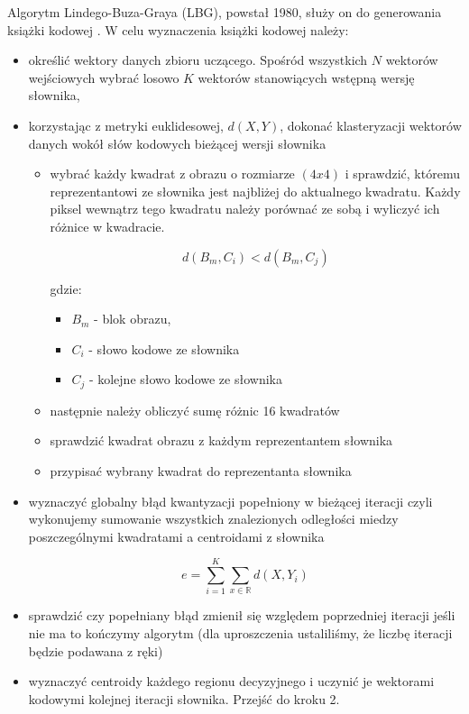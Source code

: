\documentclass{article}
\begin{document}
Algorytm Lindego-Buza-Graya (LBG), powstał 1980, służy on do generowania książki kodowej \cite{lbg1980}. W celu wyznaczenia książki kodowej należy:

\begin{itemize} 
  \item określić wektory danych zbioru uczącego. Spośród wszystkich $N$ wektorów wejściowych
        wybrać losowo $K$ wektorów stanowiących wstępną wersję słownika,
  \item korzystając z metryki euklidesowej, $d(X,Y)$, dokonać klasteryzacji wektorów danych wokół słów kodowych bieżącej wersji słownika
        \begin{itemize}
          \item wybrać każdy kwadrat z obrazu o rozmiarze $(4x4)$ i sprawdzić, któremu reprezentantowi ze słownika jest najbliżej do
                aktualnego kwadratu. Każdy piksel wewnątrz tego kwadratu należy porównać ze sobą i wyliczyć ich różnice w kwadracie.
                
                \begin{equation}
                  d(B_{m}, C_{i}) < d(B_{m}, C_{j})
                \end{equation}
                
                gdzie:
                \begin{itemize}[label=]
                  \item $B_{m}$ - blok obrazu,
                  \item $C_{i}$ - słowo kodowe ze słownika
                  \item $C_{j}$ - kolejne słowo kodowe ze słownika
                \end{itemize}
                
          \item następnie należy obliczyć sumę różnic 16 kwadratów
          \item sprawdzić kwadrat obrazu z każdym reprezentantem słownika
          \item przypisać wybrany kwadrat do reprezentanta słownika
        \end{itemize}
  \item wyznaczyć globalny błąd kwantyzacji popełniony w bieżącej iteracji czyli wykonujemy sumowanie wszystkich
        znalezionych odległości miedzy poszczególnymi kwadratami a centroidami z słownika
        
        \begin{equation}
          \label{eq:lbg_error}
          e = \sum_{i=1}^K \sum_{x\in\mathbb{R}} d(X, Y_{i}) 
        \end{equation}
        
  \item sprawdzić czy popełniany błąd zmienił się względem poprzedniej iteracji jeśli nie ma to kończymy algorytm
        (dla uproszczenia ustaliliśmy, że liczbę iteracji będzie podawana z ręki)
  \item wyznaczyć centroidy każdego regionu decyzyjnego i uczynić je wektorami kodowymi kolejnej iteracji słownika. Przejść do kroku 2.
\end{itemize}
\end{document}
